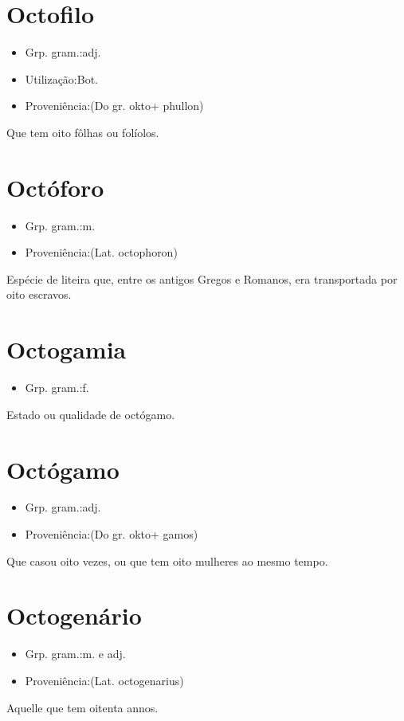 \section{Octofilo}
\begin{itemize}
\item {Grp. gram.:adj.}
\end{itemize}
\begin{itemize}
\item {Utilização:Bot.}
\end{itemize}
\begin{itemize}
\item {Proveniência:(Do gr. \textunderscore okto\textunderscore  + \textunderscore phullon\textunderscore )}
\end{itemize}
Que tem oito fôlhas ou folíolos.
\section{Octóforo}
\begin{itemize}
\item {Grp. gram.:m.}
\end{itemize}
\begin{itemize}
\item {Proveniência:(Lat. \textunderscore octophoron\textunderscore )}
\end{itemize}
Espécie de liteira que, entre os antigos Gregos e Romanos, era transportada por oito escravos.
\section{Octogamia}
\begin{itemize}
\item {Grp. gram.:f.}
\end{itemize}
Estado ou qualidade de octógamo.
\section{Octógamo}
\begin{itemize}
\item {Grp. gram.:adj.}
\end{itemize}
\begin{itemize}
\item {Proveniência:(Do gr. \textunderscore okto\textunderscore  + \textunderscore gamos\textunderscore )}
\end{itemize}
Que casou oito vezes, ou que tem oito mulheres ao mesmo tempo.
\section{Octogenário}
\begin{itemize}
\item {Grp. gram.:m.  e  adj.}
\end{itemize}
\begin{itemize}
\item {Proveniência:(Lat. \textunderscore octogenarius\textunderscore )}
\end{itemize}
Aquelle que tem oitenta annos.
